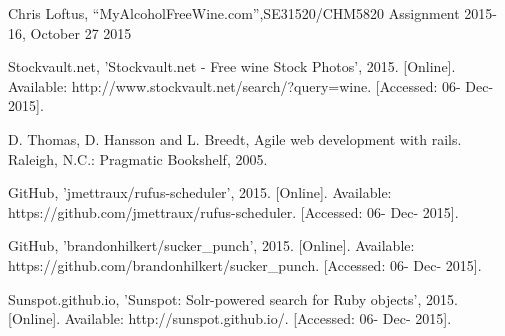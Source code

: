 \documentclass[12pt]{article}
\begin{document}
\begin{thebibliography}{5}

 Chris Loftus, ``MyAlcoholFreeWine.com'',SE31520/CHM5820 Assignment 2015-16, October 27 2015

 Stockvault.net, 'Stockvault.net - Free wine Stock Photos', 2015. [Online]. Available: http://www.stockvault.net/search/?query=wine. [Accessed: 06- Dec- 2015].

 D. Thomas, D. Hansson and L. Breedt, Agile web development with rails. Raleigh, N.C.: Pragmatic Bookshelf, 2005.

 GitHub, 'jmettraux/rufus-scheduler', 2015. [Online]. Available: https://github.com/jmettraux/rufus-scheduler. [Accessed: 06- Dec- 2015].

 GitHub, 'brandonhilkert/sucker\_punch', 2015. [Online]. Available: https://github.com/brandonhilkert/sucker\_punch. [Accessed: 06- Dec- 2015].

  Sunspot.github.io, 'Sunspot: Solr-powered search for Ruby objects', 2015. [Online]. Available: http://sunspot.github.io/. [Accessed: 06- Dec- 2015].

\end{thebibliography}
\end{document}
